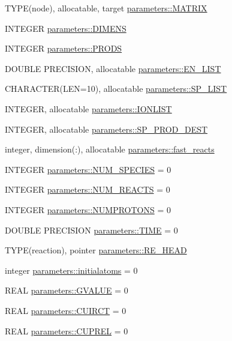 \begin{DoxyCompactItemize}
\item 
TYPE(node), allocatable, target \hyperlink{namespaceparameters_a1d2ec6532bce135a8fc18f3542969a8d}{parameters::MATRIX}
\item 
INTEGER \hyperlink{namespaceparameters_a8eba14af35a7a362f50093f1acc28a78}{parameters::DIMENS}
\item 
INTEGER \hyperlink{namespaceparameters_a00c44079184906f8aff60ad7cea2fe4d}{parameters::PRODS}
\item 
DOUBLE PRECISION, allocatable \hyperlink{namespaceparameters_a41b06e1dd582bb56419bf991f2c633e3}{parameters::EN\_\-LIST}
\item 
CHARACTER(LEN=10), allocatable \hyperlink{namespaceparameters_a38878c1dc241cdcfc52f1804563f7b00}{parameters::SP\_\-LIST}
\item 
INTEGER, allocatable \hyperlink{namespaceparameters_a660ab08d014ed8f467dc504ed8585591}{parameters::IONLIST}
\item 
INTEGER, allocatable \hyperlink{namespaceparameters_a649c343c05b95e3f84d06401b3a3f6e1}{parameters::SP\_\-PROD\_\-DEST}
\item 
integer, dimension(:), allocatable \hyperlink{namespaceparameters_a8706bba63c5517e5b5e5b2cf0487db4b}{parameters::fast\_\-reacts}
\item 
INTEGER \hyperlink{namespaceparameters_aed3ebeff9daeb47edfa593ae2b72d4db}{parameters::NUM\_\-SPECIES} = 0
\item 
INTEGER \hyperlink{namespaceparameters_a1462d3a8d5ef4ee00ffc9c0beac695b2}{parameters::NUM\_\-REACTS} = 0
\item 
INTEGER \hyperlink{namespaceparameters_abf21c9c60fbc062ca9e84d2746c7388a}{parameters::NUMPROTONS} = 0
\item 
DOUBLE PRECISION \hyperlink{namespaceparameters_acf1d338d691bf2082aeabaec6ac27263}{parameters::TIME} = 0
\item 
TYPE(reaction), pointer \hyperlink{namespaceparameters_aff68a046aeb1fa2a7610db8cd55922d8}{parameters::RE\_\-HEAD}
\item 
integer \hyperlink{namespaceparameters_a2a130bb0e6ad790a2a783d19749cc8ce}{parameters::initialatoms} = 0
\item 
REAL \hyperlink{namespaceparameters_a3c39b69e0083dc018e4546bd5a02b301}{parameters::GVALUE} = 0
\item 
REAL \hyperlink{namespaceparameters_a2855e0778fdd644c62b1a6943a4c363a}{parameters::CUIRCT} = 0
\item 
REAL \hyperlink{namespaceparameters_a170cb61fd1eef5175a5eaf95d0d85ab5}{parameters::CUPREL} = 0

\end{DoxyCompactItemize}
